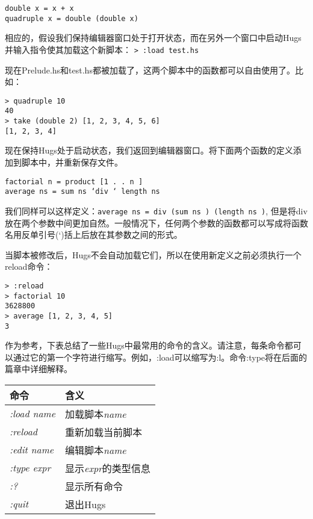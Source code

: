 \begin{verbatim}
double x = x + x
quadruple x = double (double x)
\end{verbatim}

相应的，假设我们保持编辑器窗口处于打开状态，而在另外一个窗口中启动Hugs并输入指令使其加载这个新脚本：
\verb|> :load test.hs|

现在Prelude.hs和test.hs都被加载了，这两个脚本中的函数都可以自由使用了。比如：

\begin{verbatim}
> quadruple 10
40
> take (double 2) [1, 2, 3, 4, 5, 6]
[1, 2, 3, 4]
\end{verbatim}

现在保持Hugs处于启动状态，我们返回到编辑器窗口。将下面两个函数的定义添加到脚本中，并重新保存文件。

\begin{verbatim}
factorial n = product [1 . . n ]
average ns = sum ns ‘div ‘ length ns
\end{verbatim}

我们同样可以这样定义：\verb|average ns = div (sum ns ) (length ns )|,
但是将div放在两个参数中间更加自然。一般情况下，任何两个参数的函数都可以写成将函数名用反单引号(`)括上后放在其参数之间的形式。

当脚本被修改后，Hugs不会自动加载它们，所以在使用新定义之前必须执行一个reload命令：
\begin{verbatim}
> :reload
> factorial 10
3628800
> average [1, 2, 3, 4, 5]
3
\end{verbatim}

作为参考，下表总结了一些Hugs中最常用的命令的含义。请注意，每条命令都可以通过它的第一个字符进行缩写。例如，:load可以缩写为:l。命令:type将在后面的篇章中详细解释。

\begin{table}[htbp]
\label{tab:threesome}
\centering
\begin{tabular}{ll}
\hline
命令 & 含义\\
\hline
\textit{:load name} & 加载脚本\textit{name} \\
\textit{:reload} & 重新加载当前脚本 \\
\textit{:edit name} & 编辑脚本\textit{name} \\
\textit{:type expr} & 显示\textit{expr}的类型信息 \\
\textit{:?} & 显示所有命令 \\
\textit{:quit} & 退出Hugs \\
\hline
\end{tabular}
\end{table}


